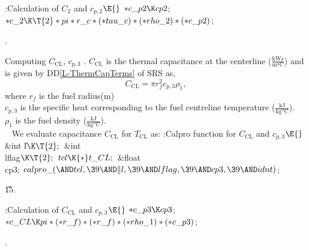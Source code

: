 \documentclass[letterpaper,12pt,baseclass=report]{cweb-hy}
\begin{document}
{
\Y\B\4:Calculation of $C_{2}$ and $c_{p,2}$\X${}\E{}$\6
${*}\\{c\_p2}\K\\{cp2}{}$;\6
${}{*}\\{c\_2}\K\T{2}*\\{pi}*\\{r\_c}*({*}\\{tau\_c})*({*}\\{rho\_2})*({*}\\{c%
\_p2}){}$;\par
{}.\fi

\fi

Computing  ${C_{\text{CL}}}$, ${c_{p,3}}$ .\label{c3cp3}
$C_{\text{CL}}$ is the thermal capacitance at the centerline
($\mathrm{\frac{kW s}{m^oC}}$) and is given by DD\ref{L-ThermCapTerms}
of SRS as,
\begin{equation}
C_{\text{CL}} =  \pi r_f ^2 c_{p,3}\rho_ 1, \label{C_3}
\end{equation}
where
$r_f$ is the fuel radius($\text{m}$)\\
$c_{p,3}$ is the specific heat corresponding to
the fuel centreline temperature ($\mathrm{\frac{kJ}{kg^oC}}$).\\
$\rho_1$ is the fuel density ($\mathrm{\frac{kJ}{kg^oC}}$).\\
~\newline
We evaluate capacitance $C_{\text{CL}}$ for $T_{\mathrm{CL}}$ as:
\Y\B\4:Calpro function for $C_{\text{CL}}$ and $c_{p,3}$\X${}\E{}$\6
\&{int} \|l${}\K\T{2};{}$\6
\&{int} \\{lflag}${}\K\T{2};{}$\7
${}\\{tcl}\K{*}\\{t\_CL};{}$\7
\&{float} \\{cp3};\7
${}\\{calpro\_}({\AND}\\{tcl},\39{\AND}\|l,\39{\AND}\\{lflag},\39{\AND}\\{cp3},%
\39{\AND}\\{idnt}){}$;\par
\U15.\fi

\Y\B\4:Calculation of $C_{\text{CL}}$ and $c_{p,3}$\X${}\E{}$\6
${*}\\{c\_p3}\K\\{cp3}{}$;\6
${}{*}\\{c\_CL}\K\\{pi}*({*}\\{r\_f})*({*}\\{r\_f})*({*}\\{rho\_1})*({*}\\{c%
\_p3}){}$;\par
{}.\fi

}
\end{document}
